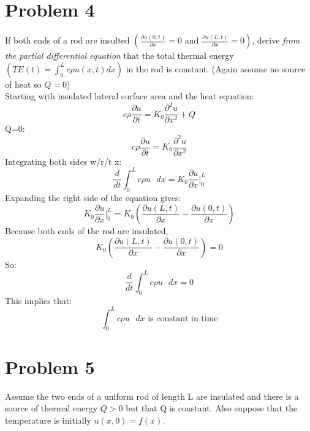 \documentclass[preview,12pt]{article}
\begin{document}
\section*{Problem 4}
    If both ends of a rod are insulted $\left(\frac{\partial u(0,t)}{\partial x}=0 \textrm{ and } \frac{\partial u(L,t)}{\partial x}=0\right)$, derive \textit{from the partial differential equation} that the total thermal energy $\left(TE(t)=\int_0^Lc\rho u(x,t)dx\right)$ in the rod is constant.  (Again assume no source of heat so $Q=0$)
    $$$$
    Starting with insulated lateral surface area and the heat equation:
    $$c\rho\frac{\partial u}{\partial t}=K_0\frac{\partial^2u}{\partial x^2}+Q$$
    Q=0:
    $$c\rho\frac{\partial u}{\partial t}=K_0\frac{\partial^2u}{\partial x^2}$$
    Integrating both sides w/r/t x:
    $$\frac{d}{dt}\int_0^L c\rho u \textrm{ } dx = K_0\frac{\partial u}{\partial x}|_0^L$$
    Expanding the right side of the equation gives:
    $$K_0\frac{\partial u}{\partial x}|_0^L=K_0\left(\frac{\partial u(L,t)}{\partial x}-\frac{\partial u(0,t)}{\partial x}\right)$$
    Because both ends of the rod are insulated, 
    $$K_0\left(\frac{\partial u(L,t)}{\partial x}-\frac{\partial u(0,t)}{\partial x}\right)=0$$
    So: 
    $$\frac{d}{dt}\int_0^L c\rho u \textrm{ } dx = 0$$
    This implies that:
    $$\int_0^L c\rho u \textrm{ } dx \textrm{ is constant in time}$$
    
\section*{Problem 5}
    Assume the two ends of a uniform rod of length L are insulated and there is a source of thermal energy $Q>0$ but that Q is constant.  Also suppose that the temperature is initially $u(x,0)=f(x)$.
\end{document}
